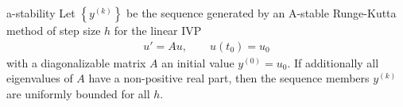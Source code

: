 \begin{Theorem}{a-stability}
  Let $\left\{y^{(k)}\right\}$ be the sequence generated by an
  A-stable Runge-Kutta method of step size $h$ for the linear IVP
  \begin{gather*}
    u'=Au, \qquad u(t_0) = u_0
  \end{gather*}
  with a diagonalizable matrix $A$ an initial value $y^{(0)} =
  u_0$. If additionally all eigenvalues of $A$ have a non-positive
  real part, then the sequence members $y^{(k)}$ are uniformly bounded
  for all $h$.
\end{Theorem}
